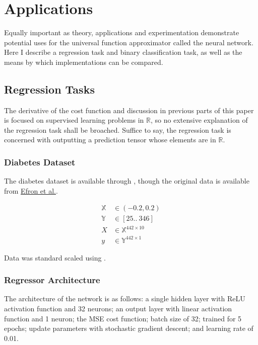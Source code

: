 \documentclass{article}
\begin{document}
\clearpage

\section{Applications}

Equally important as theory, applications and experimentation demonstrate
potential uses for the universal function approximator called the neural network.
Here I describe a regression task and binary classification task, as well as
the means by which implementations can be compared.

\subsection{Regression Tasks}

The derivative of the cost function and discussion in previous parts of this
paper is focused on supervised learning problems in $\mathbb{R}$, so no
extensive explanation of the regression task shall be broached. Suffice to say,
the regression task is concerned with outputting a prediction tensor whose
elements are in $\mathbb{R}$.

\subsubsection{Diabetes Dataset}

The diabetes dataset is available through , though the
original data is available from \href{https://www4.stat.ncsu.edu/~boos/var.select/diabetes.html}{Efron et al.}.

\begin{align}
	\mathbb{X} & \in (-0.2, 0.2)                \\
	\mathbb{Y} & \in [25..\ 346]                \\
	X          & \in \mathbb{X}^{442 \times 10} \\
	y          & \in \mathbb{Y}^{442 \times 1}
\end{align}

Data was standard scaled using .

\subsubsection{Regressor Architecture}

The architecture of the network is as follows: a single hidden layer with ReLU
activation function and 32 neurons; an output layer with linear activation function
and 1 neuron; the MSE cost function; batch size of 32; trained for 5 epochs;
update parameters with stochastic gradient descent; and learning rate of 0.01.
\end{document}
